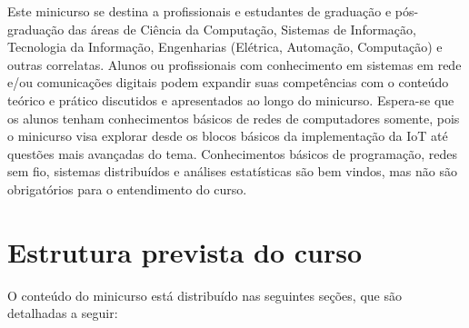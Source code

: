 \documentclass{SBCbookchapter}
\begin{document}
Este minicurso se destina a profissionais e estudantes de graduação e 
pós-graduação das áreas de Ciência da Computação, Sistemas de Informação, 
Tecnologia da Informação, Engenharias (Elétrica, Automação, Computação) e outras 
correlatas. Alunos ou profissionais com conhecimento em sistemas em rede e/ou 
comunicações digitais podem expandir suas competências com o conteúdo teórico e 
prático discutidos e apresentados ao longo do minicurso. Espera-se que os alunos 
tenham conhecimentos básicos de redes de computadores somente, pois o minicurso 
visa explorar desde os blocos básicos da implementação da IoT até questões mais 
avançadas do tema. Conhecimentos básicos de programação, redes sem fio, sistemas 
distribuídos e análises estatísticas são bem vindos, mas não são obrigatórios 
para o entendimento do curso.


\section{Estrutura prevista do curso}

O conteúdo do minicurso está distribuído nas seguintes seções, que são 
detalhadas a seguir:
\end{document}
